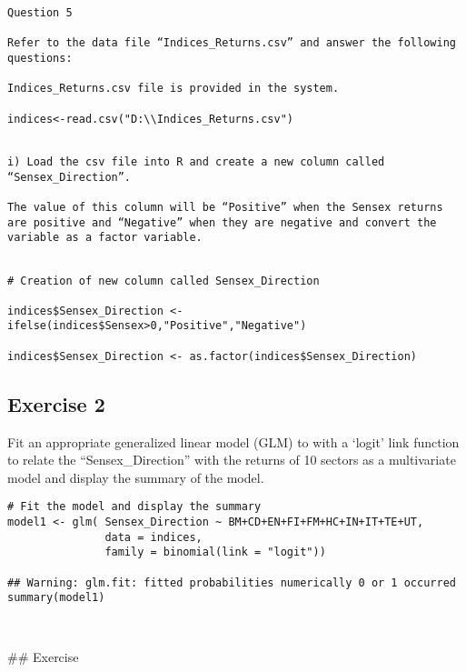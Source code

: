\documentclass[a4paper,12pt]{article}
\begin{document}
\begin{framed} \begin{verbatim}
Question 5

Refer to the data file “Indices_Returns.csv” and answer the following questions:

Indices_Returns.csv file is provided in the system.

indices<-read.csv("D:\\Indices_Returns.csv")
\end{verbatim}\end{framed}


\begin{framed} \begin{verbatim}

i) Load the csv file into R and create a new column called “Sensex_Direction”. 

The value of this column will be “Positive” when the Sensex returns are positive and “Negative” when they are negative and convert the variable as a factor variable. 
\end{verbatim}\end{framed}


\begin{framed} \begin{verbatim}

# Creation of new column called Sensex_Direction

indices$Sensex_Direction <-     ifelse(indices$Sensex>0,"Positive","Negative")

indices$Sensex_Direction <- as.factor(indices$Sensex_Direction)

\end{verbatim}\end{framed}

\newpage 
\subsection*{Exercise 2}

Fit an appropriate generalized linear model (GLM) to with a ‘logit’ link function to relate the “Sensex_Direction” with the returns of 10 sectors as a multivariate model and display
the summary of the model. 



\begin{framed} \begin{verbatim}
# Fit the model and display the summary
model1 <- glm( Sensex_Direction ~ BM+CD+EN+FI+FM+HC+IN+IT+TE+UT,
               data = indices, 
               family = binomial(link = "logit"))

## Warning: glm.fit: fitted probabilities numerically 0 or 1 occurred
summary(model1)



\end{verbatim}\end{framed}
\newpage 
## Exercise 
\end{document}
